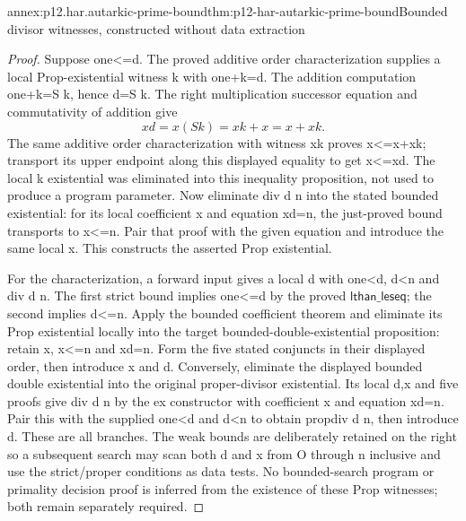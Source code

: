 \begin{annexitem}{annex:p12.har.autarkic-prime-bound}{thm:p12-har-autarkic-prime-bound}{Bounded divisor witnesses, constructed without data extraction}
\begin{proof}
Suppose one<=d. The proved additive order characterization supplies
a local Prop-existential witness k with one+k=d. The addition computation
one+k=S k, hence d=S k. The right multiplication successor equation
and commutativity of addition give
\[
 xd=x(S k)=xk+x=x+xk.
\]
The same additive order characterization with witness xk proves
x<=x+xk; transport its upper endpoint along this displayed equality
to get x<=xd. The local k existential was eliminated into this inequality
proposition, not used to produce a program parameter.
Now eliminate div d n into the stated bounded existential: for its
local coefficient x and equation xd=n, the just-proved bound transports
to x<=n. Pair that proof with the given equation and introduce the
same local x. This constructs the asserted Prop existential.

For the characterization, a forward input gives a local d with
one<d, d<n and div d n. The first strict bound implies one<=d by
the proved \(\mathsf{lthan\_leseq}\); the second implies d<=n. Apply the bounded
coefficient theorem and eliminate its Prop existential locally into
the target bounded-double-existential proposition: retain x, x<=n
and xd=n. Form the five stated conjuncts in their displayed order,
then introduce x and d. Conversely, eliminate the displayed bounded
double existential into the original proper-divisor existential.
Its local d,x and five proofs give div d n by the ex constructor
with coefficient x and equation xd=n. Pair this with the supplied
one<d and d<n to obtain propdiv d n, then introduce d.
These are all branches. The weak bounds are deliberately retained
on the right so a subsequent search may scan both d and x from O
through n inclusive and use the strict/proper conditions as data tests.
No bounded-search program or primality decision proof is inferred from
the existence of these Prop witnesses; both remain separately required.
\end{proof}
\end{annexitem}


